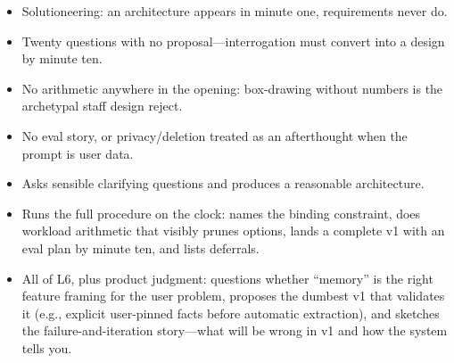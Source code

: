 \begin{interviewq}
\redflags
\begin{itemize}
    \item Solutioneering: an architecture appears in minute one, requirements never do.
    \item Twenty questions with no proposal---interrogation must convert into a design by minute ten.
    \item No arithmetic anywhere in the opening: box-drawing without numbers is the archetypal staff design reject.
    \item No eval story, or privacy/deletion treated as an afterthought when the prompt is user data.
\end{itemize}


\goodgreat
\begin{itemize}
    \item {} Asks sensible clarifying questions and produces a reasonable architecture.
    \item {} Runs the full procedure on the clock: names the binding constraint, does workload arithmetic that visibly prunes options, lands a complete v1 with an eval plan by minute ten, and lists deferrals.
    \item {} All of L6, plus product judgment: questions whether ``memory'' is the right feature framing for the user problem, proposes the dumbest v1 that validates it (e.g., explicit user-pinned facts before automatic extraction), and sketches the failure-and-iteration story---what will be wrong in v1 and how the system tells you.
\end{itemize}

\end{interviewq}
